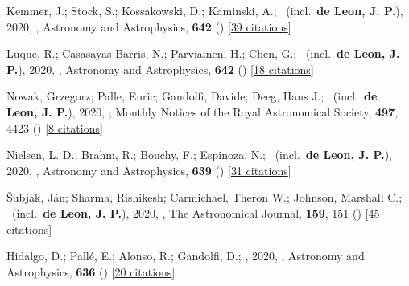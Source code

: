 \item[{\color{numcolor}\scriptsize27}] Kemmer, J.; Stock, S.; Kossakowski, D.; Kaminski, A.; \etal\ (incl.\ \textbf{de Leon, J. P.}), 2020, , Astronomy and Astrophysics, \textbf{642} () [\href{https://ui.adsabs.harvard.edu/abs/2020A&A...642A.236K}{39 citations}]

\item[{\color{numcolor}\scriptsize26}] Luque, R.; Casasayas-Barris, N.; Parviainen, H.; Chen, G.; \etal\ (incl.\ \textbf{de Leon, J. P.}), 2020, , Astronomy and Astrophysics, \textbf{642} () [\href{https://ui.adsabs.harvard.edu/abs/2020A&A...642A..50L}{18 citations}]

\item[{\color{numcolor}\scriptsize25}] Nowak, Grzegorz; Palle, Enric; Gandolfi, Davide; Deeg, Hans J.; \etal\ (incl.\ \textbf{de Leon, J. P.}), 2020, , Monthly Notices of the Royal Astronomical Society, \textbf{497}, 4423 () [\href{https://ui.adsabs.harvard.edu/abs/2020MNRAS.497.4423N}{8 citations}]

\item[{\color{numcolor}\scriptsize24}] Nielsen, L. D.; Brahm, R.; Bouchy, F.; Espinoza, N.; \etal\ (incl.\ \textbf{de Leon, J. P.}), 2020, , Astronomy and Astrophysics, \textbf{639} () [\href{https://ui.adsabs.harvard.edu/abs/2020A&A...639A..76N}{31 citations}]

\item[{\color{numcolor}\scriptsize23}] {\v{S}}ubjak, J{\'a}n; Sharma, Rishikesh; Carmichael, Theron W.; Johnson, Marshall C.; \etal\ (incl.\ \textbf{de Leon, J. P.}), 2020, , The Astronomical Journal, \textbf{159}, 151 () [\href{https://ui.adsabs.harvard.edu/abs/2020AJ....159..151S}{45 citations}]

\item[{\color{numcolor}\scriptsize22}] Hidalgo, D.; Pall{\'e}, E.; Alonso, R.; Gandolfi, D.; \etal, 2020, , Astronomy and Astrophysics, \textbf{636} () [\href{https://ui.adsabs.harvard.edu/abs/2020A&A...636A..89H}{20 citations}]

